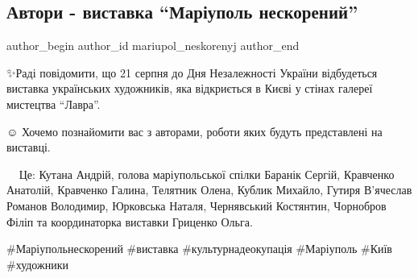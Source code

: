  
 
 
 
 

\subsection{Автори - виставка \enquote{Маріуполь нескорений}}
\label{sec:03_08_2023.fb.mariupol_neskorenyj.1.avtory_vystavka_mariupol_neskorenyj}

\ifcmt
 author_begin
   author_id mariupol_neskorenyj
 author_end
\fi

✨️Раді повідомити, що 21 серпня до Дня Незалежності України відбудеться
виставка українських художників, яка відкриється в Києві у стінах галереї
мистецтва \enquote{Лавра}.

☺️ Хочемо познайомити вас з авторами, роботи яких будуть представлені на виставці. 

👨🎨👩🎨Це: Кутана Андрій, голова маріупольської спілки Баранік
Сергій, Кравченко Анатолій, Кравченко Галина, Телятник Олена, Кублик Михайло,
Гутиря В'ячеслав  Романов Володимир, Юрковська Наталя, Чернявський Костянтин,
Чорнобров Філіп та координаторка виставки Гриценко Ольга.

\#Маріупольнескорений \#виставка \#культурнадеокупація \#Маріуполь \#Київ \#художники
